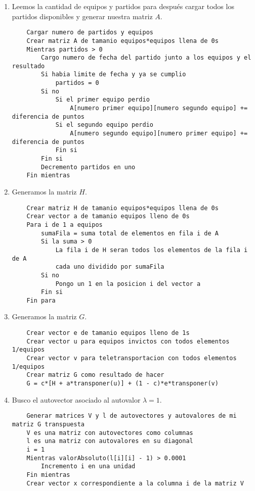 \begin{enumerate}
	\item Leemos la cantidad de equipos y partidos para después cargar todos los
	partidos disponibles y generar nuestra matriz $A$.
	\begin{lstlisting}
	Cargar numero de partidos y equipos
	Crear matriz A de tamanio equipos*equipos llena de 0s
	Mientras partidos > 0
		Cargo numero de fecha del partido junto a los equipos y el resultado
		Si habia limite de fecha y ya se cumplio
			partidos = 0
		Si no
			Si el primer equipo perdio
				A[numero primer equipo][numero segundo equipo] += diferencia de puntos
			Si el segundo equipo perdio
				A[numero segundo equipo][numero primer equipo] += diferencia de puntos
			Fin si
		Fin si
		Decremento partidos en uno
	Fin mientras
	\end{lstlisting}

	\item Generamos la matriz $H$.
	\begin{lstlisting}
	Crear matriz H de tamanio equipos*equipos llena de 0s
	Crear vector a de tamanio equipos lleno de 0s
	Para i de 1 a equipos
		sumaFila = suma total de elementos en fila i de A
		Si la suma > 0
			La fila i de H seran todos los elementos de la fila i de A
			cada uno dividido por sumaFila
		Si no
			Pongo un 1 en la posicion i del vector a
		Fin si
	Fin para
	\end{lstlisting}

	\item Generamos la matriz $G$.
	\begin{lstlisting}
	Crear vector e de tamanio equipos lleno de 1s
	Crear vector u para equipos invictos con todos elementos 1/equipos
	Crear vector v para teletransportacion con todos elementos 1/equipos
	Crear matriz G como resultado de hacer
	G = c*[H + a*transponer(u)] + (1 - c)*e*transponer(v)
	\end{lstlisting}

	\item Busco el autovector asociado al autovalor $\lambda = 1$.
	\begin{lstlisting}
	Generar matrices V y l de autovectores y autovalores de mi matriz G transpuesta
	V es una matriz con autovectores como columnas
	l es una matriz con autovalores en su diagonal
	i = 1
	Mientras valorAbsoluto(l[i][i] - 1) > 0.0001
		Incremento i en una unidad
	Fin mientras
	Crear vector x correspondiente a la columna i de la matriz V
	\end{lstlisting}


\end{enumerate}
